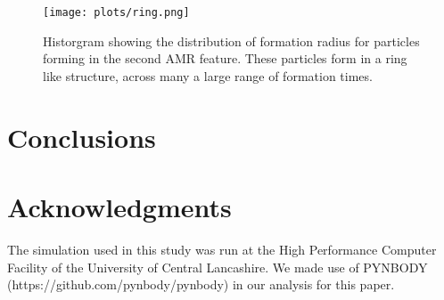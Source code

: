 \documentclass[usenatbib, useAMS,usegraphicx]{mn2e}
\begin{document}
\begin{figure}
   \centering
   \texttt{[image: plots/ring.png]}
   \caption{Historgram showing the distribution of formation radius for particles forming in the second AMR feature. These particles form in a ring like structure, across many a large range of formation times. }
   \label{fig:ring}
\end{figure}


\section{Conclusions}\label{sec:conclusions}




\section*{Acknowledgments}

The simulation used in this study was run at the High Performance Computer Facility of the University of Central Lancashire. We made use of PYNBODY (https://github.com/pynbody/pynbody) in our analysis for this paper.





\label{lastpage}
\end{document}
